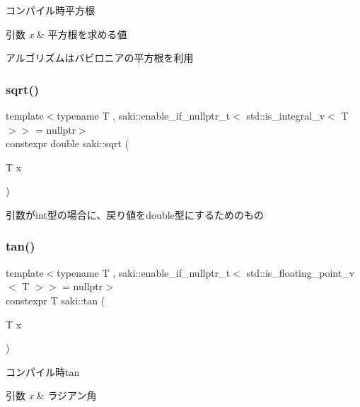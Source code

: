 コンパイル時平方根 


\begin{DoxyParams}{引数}
{\em x} & 平方根を求める値\\
\hline
\end{DoxyParams}
アルゴリズムはバビロニアの平方根を利用 \mbox{\label{namespacesaki_a66fac13294984ad19b8b7fec3b5466b5}} 
\subsubsection{\texorpdfstring{sqrt()}{sqrt()}\hspace{0.1cm}{\footnotesize\ttfamily [2/2]}}
{\footnotesize\ttfamily template$<$typename T , saki\+::enable\+\_\+if\+\_\+nullptr\+\_\+t$<$ std\+::is\+\_\+integral\+\_\+v$<$ T $>$$>$  = nullptr$>$ \\
constexpr double saki\+::sqrt (\begin{DoxyParamCaption}\item[{T}]{x }\end{DoxyParamCaption})}



引数がint型の場合に、戻り値をdouble型にするためのもの 

\mbox{\label{namespacesaki_a491321db8475898649b625dca5401726}} 
\subsubsection{\texorpdfstring{tan()}{tan()}\hspace{0.1cm}{\footnotesize\ttfamily [1/2]}}
{\footnotesize\ttfamily template$<$typename T , saki\+::enable\+\_\+if\+\_\+nullptr\+\_\+t$<$ std\+::is\+\_\+floating\+\_\+point\+\_\+v$<$ T $>$$>$  = nullptr$>$ \\
constexpr T saki\+::tan (\begin{DoxyParamCaption}\item[{T}]{x }\end{DoxyParamCaption})}



コンパイル時tan 


\begin{DoxyParams}{引数}
{\em x} & ラジアン角 \\
\hline
\end{DoxyParams}
\mbox{\label{namespacesaki_a52704083849bbdf4ab635cca985c00ae}} 

